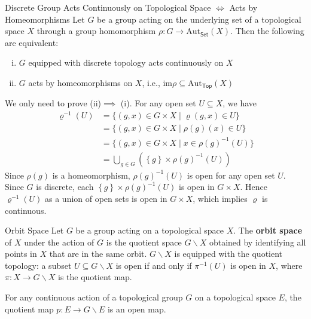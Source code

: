 \begin{proposition}{Discrete Group Acts Continuously on Topological Space $\iff$ Acts by Homeomorphisms}{}
    Let $G$ be a group acting on the underlying set of a topological space $X$ through a group homomorphism $\rho:G\to \mathrm{Aut}_{\mathsf{Set}}(X)$. Then the following are equivalent:
    \begin{enumerate}[(i)]
        \item $G$ equipped with discrete topology acts continuously on $X$ 
        \item $G$ acts by homeomorphisms on $X$, i.e.,
        $\mathrm{im}\rho \subseteq \mathrm{Aut}_{\mathsf{Top}}(X)$
    \end{enumerate}
\end{proposition}
\begin{prf}
    We only need to prove (ii)$\implies$ (i). For any open set $U\subseteq X$, we have
    \begin{align*}
        \varrho^{-1}(U)&=\{(g,x)\in G\times X\mid \varrho(g,x)\in U\}\\
        &=\{(g,x)\in G\times X\mid \rho(g)(x)\in U\}\\
        &=\{(g,x)\in G\times X\mid x\in \rho(g)^{-1}(U)\}\\
        &=\bigcup_{g\in G}\left(\left\{g\right\}\times \rho(g)^{-1}(U) \right)
    \end{align*}
    Since $\rho(g)$ is a homeomorphism, $\rho(g)^{-1}(U)$ is open for any open set $U$. Since $G$ is discrete,  each $\left\{g\right\}\times \rho(g)^{-1}(U)$ is open in $G\times X$. Hence $\varrho^{-1}(U)$ as a union of open sets is open in $G\times X$, which implies $\varrho$ is continuous.
\end{prf}


\begin{definition}{Orbit Space}{}
	Let $G$ be a group acting on a topological space $X$. The \textbf{orbit space} of $X$ under the action of $G$ is the quotient space $G\backslash X $ obtained by identifying all points in $X$ that are in the same orbit. $G\backslash X $ is equipped with the quotient topology: a subset $U\subseteq G\backslash X $ is open if and only if $\pi^{-1}(U)$ is open in $X$, where $\pi:X\to  G\backslash X$ is the quotient map.
\end{definition}



\begin{proposition}{}{}
	For any continuous action of a topological group $G$ on a topological space $E$, the quotient map $p: E \rightarrow G\backslash E$ is an open map.
\end{proposition}

